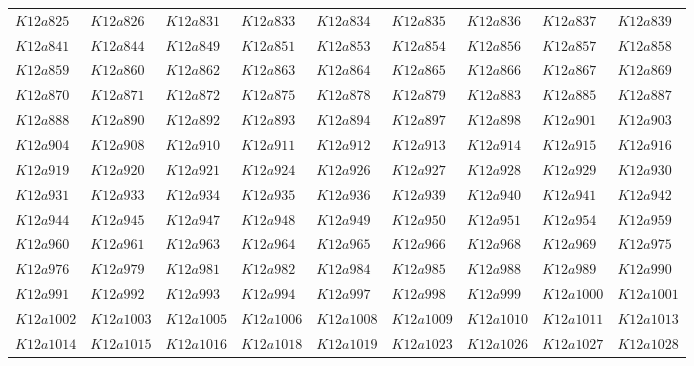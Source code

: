 \documentclass{amsart} %
\theoremstyle{thm}
\theoremstyle{definition}
\numberwithin{equation}{section}
\begin{document}
{\begin{longtable}{@{}lllllllll@{}}
  $K12a825$ &  
  $K12a826$ &  
  $K12a831$ &  
  $K12a833$ &  
  $K12a834$ &  
  $K12a835$ &  
  $K12a836$ &  
  $K12a837$ &  
  $K12a839$ \\   
  $K12a841$ &  
  $K12a844$ &  
  $K12a849$ &  
  $K12a851$ &  
  $K12a853$ &  
  $K12a854$ &  
  $K12a856$ &  
  $K12a857$ &  
  $K12a858$ \\   
  $K12a859$ &  
  $K12a860$ &  
  $K12a862$ &  
  $K12a863$ &  
  $K12a864$ &  
  $K12a865$ &  
  $K12a866$ &  
  $K12a867$ &  
  $K12a869$ \\   
  $K12a870$ &  
  $K12a871$ &  
  $K12a872$ &  
  $K12a875$ &  
  $K12a878$ &  
  $K12a879$ &  
  $K12a883$ &  
  $K12a885$ &  
  $K12a887$ \\   
  $K12a888$ &  
  $K12a890$ &  
  $K12a892$ &  
  $K12a893$ &  
  $K12a894$ &  
  $K12a897$ &  
  $K12a898$ &  
  $K12a901$ &  
  $K12a903$ \\   
  $K12a904$ &  
  $K12a908$ &  
  $K12a910$ &  
  $K12a911$ &  
  $K12a912$ &  
  $K12a913$ &  
  $K12a914$ &  
  $K12a915$ &  
  $K12a916$ \\   
  $K12a919$ &  
  $K12a920$ &  
  $K12a921$ &  
  $K12a924$ &  
  $K12a926$ &  
  $K12a927$ &  
  $K12a928$ &  
  $K12a929$ &  
  $K12a930$ \\   
  $K12a931$ &  
  $K12a933$ &  
  $K12a934$ &  
  $K12a935$ &  
  $K12a936$ &  
  $K12a939$ &  
  $K12a940$ &  
  $K12a941$ &  
  $K12a942$ \\   
  $K12a944$ &  
  $K12a945$ &  
  $K12a947$ &  
  $K12a948$ &  
  $K12a949$ &  
  $K12a950$ &  
  $K12a951$ &  
  $K12a954$ &  
  $K12a959$ \\  
  $K12a960$ &  
  $K12a961$ &  
  $K12a963$ &  
  $K12a964$ &  
  $K12a965$ &  
  $K12a966$ &  
  $K12a968$ &  
  $K12a969$ &  
  $K12a975$ \\   
  $K12a976$ &  
  $K12a979$ &  
  $K12a981$ &  
  $K12a982$ &  
  $K12a984$ &  
  $K12a985$ &  
  $K12a988$ &  
  $K12a989$ &  
  $K12a990$ \\  
  $K12a991$ &  
  $K12a992$ &  
  $K12a993$ &  
  $K12a994$ &  
  $K12a997$ &  
  $K12a998$ &  
  $K12a999$ &   
  $K12a1000$ &  
  $K12a1001$ \\   
  $K12a1002$ &  
  $K12a1003$ &  
  $K12a1005$ &  
  $K12a1006$ &  
  $K12a1008$ &  
  $K12a1009$ &  
  $K12a1010$ &  
  $K12a1011$ &  
  $K12a1013$ \\   
  $K12a1014$ &  
  $K12a1015$ &  
  $K12a1016$ &  
  $K12a1018$ &  
  $K12a1019$ &  
  $K12a1023$ &  
  $K12a1026$ &  
  $K12a1027$ &  
  $K12a1028$ \\   

\end{longtable}}
\end{document}
